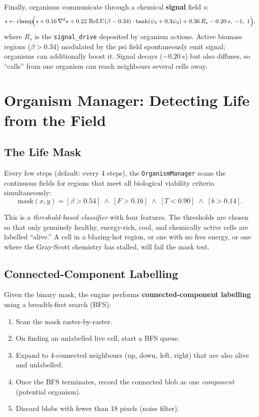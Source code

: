 \documentclass[12pt,a4paper]{article}
\DeclareMathOperator{\clamp}{clamp}
\DeclareMathOperator{\relu}{ReLU}
\begin{document}
Finally, organisms communicate through a chemical \textbf{signal} field $s$:
\begin{equation}
  s \leftarrow \clamp\!\Bigl(
    s + 0.16\,\nabla^2 s
    + 0.22\,\relu(\beta-0.34)\cdot\tanh(\psi_2 + 0.3\psi_3)
    + 0.36\,R_s - 0.20\,s,\;-1,\;1\Bigr),
\end{equation}
where $R_s$ is the \texttt{signal\_drive} deposited by organism actions.
Active biomass regions ($\beta > 0.34$) modulated by the psi field
spontaneously emit signal; organisms can additionally boost it.
Signal decays ($-0.20\,s$) but also diffuses, so
``calls'' from one organism can reach neighbours several cells away.

\section{Organism Manager: Detecting Life from the Field}

\subsection{The Life Mask}

Every few steps (default: every 4 steps),
the \texttt{OrganismManager} scans the continuous fields for
regions that meet all biological viability criteria simultaneously:
\begin{equation}
  \text{mask}(x,y) = [\beta > 0.54] \;\land\;
    [F > 0.16] \;\land\; [T < 0.90] \;\land\; [b > 0.14].
  \label{eq:mask}
\end{equation}

This is a \emph{threshold-based classifier} with four features.
The thresholds are chosen so that only genuinely healthy,
energy-rich, cool, and chemically active cells are labelled ``alive.''
A cell in a blazing-hot region, or one with no free energy,
or one where the Gray-Scott chemistry has stalled,
will fail the mask test.

\subsection{Connected-Component Labelling}

Given the binary mask, the engine performs
\textbf{connected-component labelling} using a
breadth-first search (BFS):

\begin{enumerate}[nosep]
  \item Scan the mask raster-by-raster.
  \item On finding an unlabelled live cell, start a BFS queue.
  \item Expand to 4-connected neighbours (up, down, left, right)
    that are also alive and unlabelled.
  \item Once the BFS terminates, record the connected blob as one
    \emph{component} (potential organism).
  \item Discard blobs with fewer than 18 pixels (noise filter).
\end{enumerate}
\end{document}
